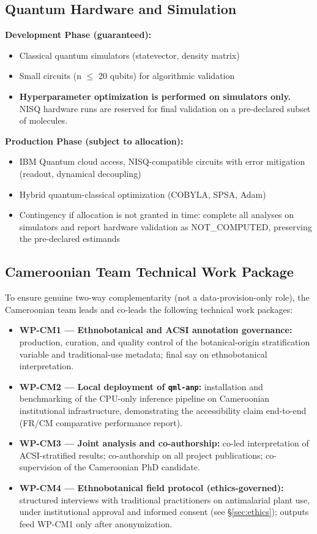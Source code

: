 \documentclass[11pt,a4paper]{article}
\begin{document}
\subsection{Quantum Hardware and Simulation}

\textbf{Development Phase (guaranteed):}
\begin{itemize}
    \item Classical quantum simulators (statevector, density matrix)
    \item Small circuits (n $\leq$ 20 qubits) for algorithmic validation
    \item \textbf{Hyperparameter optimization is performed on simulators only.} NISQ hardware runs are reserved for final validation on a pre-declared subset of molecules.
\end{itemize}

\textbf{Production Phase (subject to allocation):}
\begin{itemize}
    \item IBM Quantum cloud access, NISQ-compatible circuits with error mitigation (readout, dynamical decoupling) \cite{preskill2018}
    \item Hybrid quantum-classical optimization (COBYLA, SPSA, Adam)
    \item Contingency if allocation is not granted in time: complete all analyses on simulators and report hardware validation as NOT\_COMPUTED, preserving the pre-declared estimands
\end{itemize}

\subsection{Cameroonian Team Technical Work Package}
\label{sec:cmwork}

To ensure genuine two-way complementarity (not a data-provision-only role), the Cameroonian team leads and co-leads the following technical work packages:

\begin{itemize}
    \item \textbf{WP-CM1 --- Ethnobotanical and ACSI annotation governance:} production, curation, and quality control of the botanical-origin stratification variable and traditional-use metadata; final say on ethnobotanical interpretation.
    \item \textbf{WP-CM2 --- Local deployment of \texttt{qml-anp}:} installation and benchmarking of the CPU-only inference pipeline on Cameroonian institutional infrastructure, demonstrating the accessibility claim end-to-end (FR/CM comparative performance report).
    \item \textbf{WP-CM3 --- Joint analysis and co-authorship:} co-led interpretation of ACSI-stratified results; co-authorship on all project publications; co-supervision of the Cameroonian PhD candidate.
    \item \textbf{WP-CM4 --- Ethnobotanical field protocol (ethics-governed):} structured interviews with traditional practitioners on antimalarial plant use, under institutional approval and informed consent (see \S\ref{sec:ethics}); outputs feed WP-CM1 only after anonymization.
\end{itemize}
\end{document}
